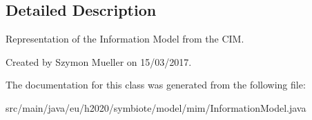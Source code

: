 \subsection{Detailed Description}
Representation of the Information Model from the C\+IM.

Created by Szymon Mueller on 15/03/2017. 

The documentation for this class was generated from the following file\+:\begin{DoxyCompactItemize}
\item 
src/main/java/eu/h2020/symbiote/model/mim/Information\+Model.\+java\end{DoxyCompactItemize}
